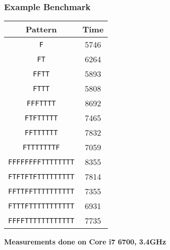 \begin{frame}
  \frametitle{Example Benchmark}
  \begin{center}
    \begin{tabular}{cc}
      \textbf{Pattern} & \textbf{Time} \\
      \toprule
      \texttt{F} & 5746 \\ %
      \texttt{FT} & 6264 \\ %
      \texttt{FFTT} & 5893 \\ %
      \texttt{FTTT} & 5808 \\ %
      \texttt{FFFTTTT} & 8692 \\ %
      \texttt{FTFTTTTT} & 7465 \\ %
      \texttt{FFTTTTTT} & 7832 \\ %
      \texttt{FTTTTTTTF} & 7059 \\ %
      \texttt{FFFFFFFFTTTTTTTT} & 8355 \\ %
      \texttt{FTFTFTFTTTTTTTTT} & 7814 \\ %
      \texttt{FFTTFFTTTTTTTTTT} & 7355 \\ %
      \texttt{FTTTFTTTTTTTTTTT} & 6931 \\ %
      \texttt{FFFFTTTTTTTTTTTT} & 7735 \\ %
    \end{tabular}
  \end{center}
  \begin{center} \bfseries
    Measurements done on Core i7 6700, 3.4GHz
  \end{center}
\end{frame}

